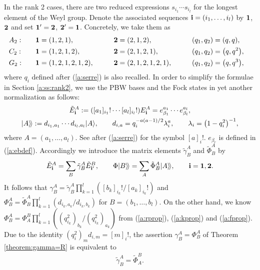 In the rank 2 cases,
there are two reduced expressions
$s_{i_1}\cdots s_{i_l}$ for the longest element of the
Weyl group.
Denote the associated sequences
${\bf i} = (i_1,\ldots, i_l)$  by ${\bf 1}$, ${\bf 2}$  and
set ${\bf 1}' = {\bf 2}$, ${\bf 2}' = {\bf 1}$.
Concretely, we take them as
\begin{alignat*}{5}
& A_2:  \quad && {\bf 1}=(1,2,1),\qquad &&{\bf 2}=(2,1,2), \qquad &&(q_1,q_2)=(q,q),& \\
& C_2: \quad && {\bf 1}=(1,2,1,2),\qquad &&{\bf 2}=(2,1,2,1), \qquad &&(q_1,q_2)=\big(q,q^2\big),& \\
& G_2: \quad && {\bf 1}=(1,2,1,2,1,2),\qquad &&{\bf 2}=(2,1,2,1,2,1), \qquad &&(q_1,q_2)=\big(q,q^3\big),&
\end{alignat*}
where $q_i$ def\/ined after (\ref{a:serre}) is also recalled.
In order to simplify the formulae in
Section \ref{a:ss:rank2}, we use the PBW bases and the
Fock states in yet another normalization as follows:
\begin{gather}
{\tilde E}^A_{\bf i}  := ([a_1]_{i_1}!\cdots [a_l]_{i_l}!) E^A_{\bf i}
= e^{a_1}_{\beta_1}\cdots e^{a_l}_{\beta_l}, \nonumber\\
|A\rangle\!\rangle  := d_{i_1,a_1}\cdots d_{i_l,a_l}|A\rangle,\qquad
d_{i,a} = q^{-a(a-1)/2}_i\lambda^a_i,\qquad
\lambda_i = \big(1-q_i^2\big)^{-1},\label{a:kett}
\end{gather}
where $A=(a_1,\ldots, a_l)$.
See after (\ref{a:serre}) for the symbol $[a]_i!$.
$e_{\beta_r}$ is def\/ined in (\ref{a:ebdef}).
Accordingly we introduce the matrix elements ${\tilde \gamma}^A_B$ and
${\tilde \Phi}^A_B$ by
\begin{gather*}
{\tilde E}^A_{\bf i} =\sum_B {\tilde \gamma}^A_B
{\tilde E}^B_{{\bf i}'},\qquad
\Phi |B\rangle\!\rangle=\sum_A {\tilde \Phi}^A_B |A\rangle\!\rangle,
\qquad {\bf i}={\bf 1}, {\bf 2}.
\end{gather*}
It follows that
$\gamma^A_B =
{\tilde \gamma}^A_B\prod\limits_{k=1}^l([b_k]_{i_k}!/[a_k]_{i_k}!)$
and
$\Phi^A_B=
{\tilde \Phi}^A_B\prod\limits_{k=1}^l(d_{i_k,a_k}/d_{i_k,b_k})$
for $B=(b_1,\ldots, b_l)$.
On the other hand, we know
$\Phi^A_B=\Phi^B_A\prod\limits_{k=1}^l((q_{i_k}^2)_{b_k}/(q_{i_k}^2)_{a_k})$
from (\ref{a:rprop}), (\ref{a:kprop}) and (\ref{a:fprop}).
Due to the identity
$(q_i^2)_md_{i,m}=[m]_i!$,
the assertion $\gamma^A_B=\Phi^A_B$
of Theorem \ref{theorem:gamma=R} is equivalent to
\begin{gather}\label{a:gyaku}
{\tilde \gamma}^A_B={\tilde \Phi^B_A}.
\end{gather}

